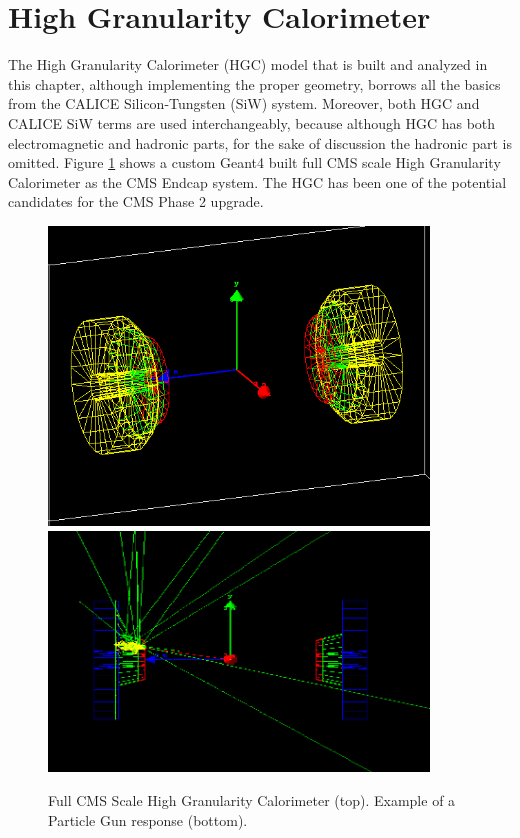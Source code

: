 \section{High Granularity Calorimeter} \label{section:simulations_hgc}
The High Granularity Calorimeter \cite{Magnan:2017exp} (HGC) model that is built and analyzed in this chapter, although implementing the proper geometry, borrows all the basics from the CALICE Silicon-Tungsten \cite{Adloff:2008aa} (SiW) system. Moreover, both {\sc HGC} and {\sc CALICE} SiW terms are used interchangeably, because although {\sc HGC} has both electromagnetic and hadronic parts, for the sake of discussion the hadronic part is omitted. Figure \ref{fig:simulations_hgcexamples} shows a custom {\sc Geant4} built full CMS scale High Granularity Calorimeter as the CMS Endcap system. The HGC has been one of the potential candidates for the CMS Phase 2 upgrade.
\begin{figure}[htbp]
    \centering
    \includegraphics[width=0.9\textwidth]{figures/ch_simulations/hgc/detetor_3d/HGC_70_20.png}
    \includegraphics[width=0.9\textwidth]{figures/ch_simulations/hgc/detetor_3d/HGCal_1Event_NoSides.png}
    \caption{Full CMS Scale High Granularity Calorimeter (top). Example of a Particle Gun response (bottom).}
    \label{fig:simulations_hgcexamples}
 \end{figure}

